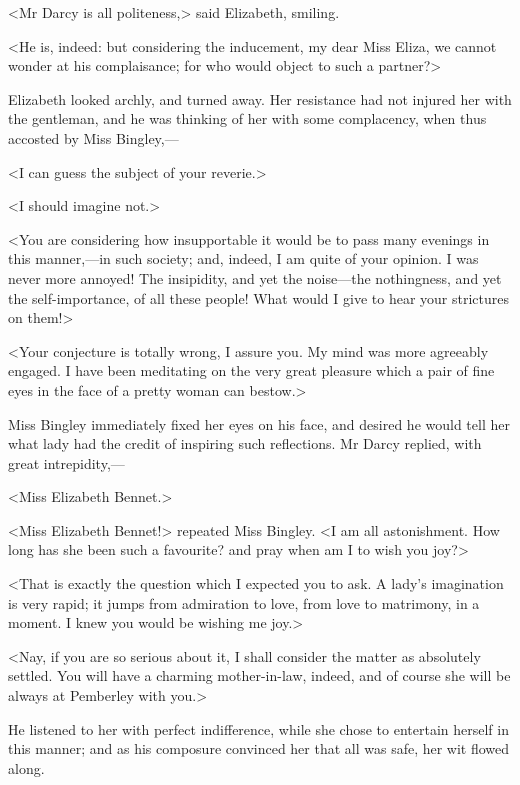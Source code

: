 <Mr Darcy is all politeness,> said Elizabeth, smiling.

<He is, indeed: but considering the inducement, my dear Miss Eliza, we cannot wonder at his complaisance; for who would object to such a partner?>

Elizabeth looked archly, and turned away. Her resistance had not injured her with the gentleman, and he was thinking of her with some complacency, when thus accosted by Miss Bingley,—

<I can guess the subject of your reverie.>

<I should imagine not.>

<You are considering how insupportable it would be to pass many evenings in this manner,—in such society; and, indeed, I am quite of your opinion. I was never more annoyed! The insipidity, and yet the noise—the nothingness, and yet the self-importance, of all these people! What would I give to hear your strictures on them!>

<Your conjecture is totally wrong, I assure you. My mind was more agreeably engaged. I have been meditating on the very great pleasure which a pair of fine eyes in the face of a pretty woman can bestow.>

Miss Bingley immediately fixed her eyes on his face, and desired he would tell her what lady had the credit of inspiring such reflections. Mr Darcy replied, with great intrepidity,—

<Miss Elizabeth Bennet.>

<Miss Elizabeth Bennet!> repeated Miss Bingley. <I am all astonishment. How long has she been such a favourite? and pray when am I to wish you joy?>

<That is exactly the question which I expected you to ask. A lady's imagination is very rapid; it jumps from admiration to love, from love to matrimony, in a moment. I knew you would be wishing me joy.>

<Nay, if you are so serious about it, I shall consider the matter as absolutely settled. You will have a charming mother-in-law, indeed, and of course she will be always at Pemberley with you.>

He listened to her with perfect indifference, while she chose to entertain herself in this manner; and as his composure convinced her that all was safe, her wit flowed along.